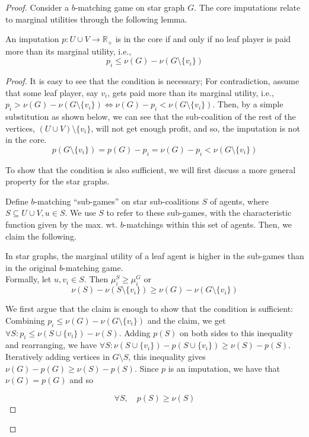 \begin{proof}
Consider a $b$-matching game on star graph $G$. The core imputations relate to marginal utilities through the following lemma. 
\begin{lemma}
\label{lem:core_marginal_utility}
    An imputation $p:U\cup V \rightarrow \mathbb{R}_+$ is in the core if and only if no leaf player is paid more than its marginal utility, i.e., 
    $$p_i \leq \nu(G) - \nu(G \setminus \{v_i\})$$
\end{lemma}

\begin{proof}
    It is easy to see that the condition is necessary; For contradiction, assume that some leaf player, say $v_i$, gets paid more than its marginal utility, i.e., $p_i > \nu(G) - \nu(G\setminus \{v_i\}) \iff \nu(G) - p_i < \nu(G\setminus \{v_i\})$. Then, by  a simple substitution as shown below, we can see that the sub-coalition of the rest of the vertices, $(U\cup V) \setminus{\{v_i\}}$, will not get enough profit, and so, the imputation is not in the core.  $$p(G\setminus \{v_i\}) = p(G) - p_i = \nu(G) - p_i < \nu(G\setminus \{v_i\})$$

    To show that the condition is also sufficient, we will first discuss a more general property for the star graphs.

    Define $b$-matching ``sub-games'' on star sub-coalitions $S$ of agents, where $S\subseteq U\cup V, u\in S$. We use $S$ to refer to these sub-games, with the characteristic function given by the max. wt. $b$-matchings within this set of agents. Then, we claim the following.

    \begin{claim}
    \label{cl:marginal_utility}
        In star graphs, the marginal utility of a leaf agent is higher in the sub-games than in the original $b$-matching game.\\
        Formally, let $u,v_i \in S$. Then 
    $\mu^S_i \geq \mu^G_i$ or $$ \nu(S) - \nu(S\setminus \{v_i\}) \geq \nu(G) - \nu(G \setminus \{v_i\}) $$
    \end{claim}
    We first argue that the claim is enough to show that the condition is sufficient: Combining $p_i \leq \nu(G)-\nu(G\setminus \{v_i\})$ and the claim, we get $\forall S: p_i \leq \nu(S\cup \{v_i\}) - \nu(S)$. 
    Adding $p(S)$ on both sides to this inequality and rearranging, we have $\forall S: \nu(S\cup \{v_i\}) - p(S\cup \{v_i\}) \geq \nu(S)-p(S)$. Iteratively adding vertices in $G\setminus S$, this inequality gives $\nu(G)-p(G) \geq \nu(S)-p(S)$. Since $p$ is an imputation, we have that $\nu(G)=p(G)$ and so
    
    $$ \forall S, \quad p(S)\geq \nu(S)$$ 

\end{proof}

\end{proof}

